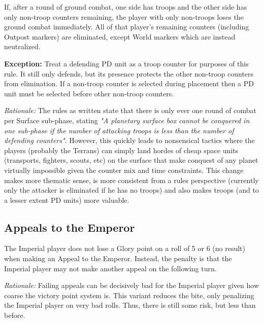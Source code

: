 If, after a round of ground combat, one side has troops and the other side has only non-troop counters remaining, the player with only non-troops loses the ground combat immediately. All of that player's remaining counters (including Outpost markers) are eliminated, except World markers which are instead neutralized.

\textbf{Exception:} Treat a defending PD unit as a troop counter for purposes of this rule. It still only defends, but its presence protects the other non-troop counters from elimination. If a non-troop counter is selected during placement then a PD unit must be selected before other non-troop counters.

\textit{Rationale:} The rules as written state that there is only ever one round of combat per Surface sub-phase, stating \textit{"A planetary surface box cannot be conquered in one sub-phase if the number of attacking troops is less than the number of defending counters"}. However, this quickly leads to nonsensical tactics where the players (probably the Terrans) can simply land hordes of cheap space units (transports, fighters, scouts, etc) on the surface that make conquest of any planet virtually impossible given the counter mix and time constraints. This change makes more thematic sense, is more consistent from a rules perspective (currently only the attacker is eliminated if he has no troops) and also makes troops (and to a lesser extent PD units) more valuable.

\subsection{Appeals to the Emperor}

The Imperial player does not lose a Glory point on a roll of 5 or 6 (no result) when making an Appeal to the Emperor. Instead, the penalty is that the Imperial player may not make another appeal on the following turn.

\textit{Rationale:} Failing appeals can be decisively bad for the Imperial player given how coarse the victory point system is. This variant reduces the bite, only penalizing the Imperial player on very bad rolls. Thus, there is still some risk, but less than before.